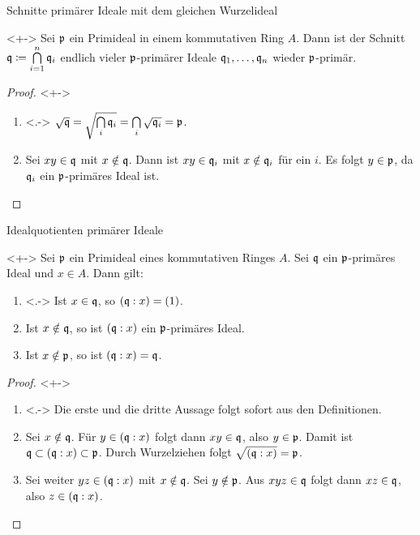 \begin{frame}{Schnitte primärer Ideale mit dem gleichen Wurzelideal}
	\begin{lemma}<+->
		\label{lem:primary1}
		Sei \(\mathfrak{p}\) ein Primideal in einem kommutativen Ring \(A\). Dann ist der Schnitt
		\(\mathfrak{q} \coloneqq \bigcap\limits_{i = 1}^n \mathfrak{q}_i\) endlich vieler \(\mathfrak{p}\)-primärer Ideale
		\(\mathfrak{q}_1, \dotsc, \mathfrak{q}_n\) wieder \(\mathfrak{p}\)-primär.
	\end{lemma}
	\begin{proof}<+->
		\begin{enumerate}[<+->]
		\item<.->
			\(\sqrt{\mathfrak{q}} = \sqrt{\bigcap\limits_i \mathfrak{q}_i} = \bigcap\limits_i \sqrt{\mathfrak{q}_i} = \mathfrak{p}\).
		\item
			Sei \(xy \in \mathfrak{q}\) mit \(x \notin \mathfrak{q}\). Dann ist \(xy \in \mathfrak{q}_i\) mit \(x \notin \mathfrak{q}_i\) für ein
			\(i\). Es folgt \(y \in \mathfrak{p}\), da \(\mathfrak{q}_i\) ein \(\mathfrak{p}\)-primäres Ideal ist.			
			\qedhere
		\end{enumerate}
	\end{proof}
\end{frame}

\begin{frame}{Idealquotienten primärer Ideale}
	\begin{lemma}<+->
		\label{lem:primary2}
		Sei \(\mathfrak{p}\) ein Primideal eines kommutativen Ringes \(A\). Sei \(\mathfrak{q}\) ein \(\mathfrak{p}\)-primäres
		Ideal und \(x \in A\). Dann gilt:
		\begin{enumerate}[<+->]
		\item<.->
			Ist \(x \in \mathfrak{q}\), so \((\mathfrak{q} : x) = (1)\).
		\item
			Ist \(x \notin \mathfrak{q}\), so ist \((\mathfrak{q} : x)\) ein \(\mathfrak{p}\)-primäres Ideal.
		\item
			Ist \(x \notin \mathfrak{p}\), so ist \((\mathfrak{q} : x) = \mathfrak{q}\).
		\end{enumerate}
	\end{lemma}
	\begin{proof}<+->
		\begin{enumerate}[<+->]
		\item<.->
			Die erste und die dritte Aussage folgt sofort aus den Definitionen.
		\item
			Sei \(x \notin \mathfrak{q}\). Für \(y \in (\mathfrak{q} : x)\) folgt dann \(x y \in \mathfrak{q}\), also \(y \in \mathfrak{p}\).
			Damit ist \(\mathfrak{q} \subset (\mathfrak{q} : x) \subset \mathfrak{p}\). Durch Wurzelziehen folgt \(\sqrt{(\mathfrak{q} : x)}
			= \mathfrak{p}\).
		\item
			Sei weiter \(yz \in (\mathfrak{q} : x)\) mit \(x \notin \mathfrak{q}\). Sei \(y \notin \mathfrak{p}\). Aus \(x y z \in \mathfrak{q}\)
			folgt dann \(xz \in \mathfrak{q}\), also \(z \in (\mathfrak{q} : x)\).
			\qedhere
		\end{enumerate}
	\end{proof}
\end{frame}

